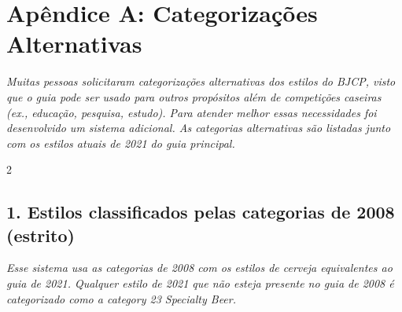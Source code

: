 \clearpage
{}
\divisorLine
\section*{Apêndice A: Categorizações Alternativas}

\textit{Muitas pessoas solicitaram categorizações alternativas dos estilos do BJCP, visto que o guia pode ser usado para outros propósitos além de competições caseiras (ex., educação, pesquisa, estudo). Para atender melhor essas necessidades foi desenvolvido um sistema adicional. As categorias alternativas são listadas junto com os estilos atuais de 2021 do guia principal.}

\begin{multicols*}{2}

\subsection*{1. Estilos classificados pelas categorias de 2008 (estrito)}

\textit{Esse sistema usa as categorias de 2008 com os estilos de cerveja equivalentes ao guia de 2021. Qualquer estilo de 2021 que não esteja presente no guia de 2008 é categorizado como a category 23 Specialty Beer.}


\end{multicols*}
